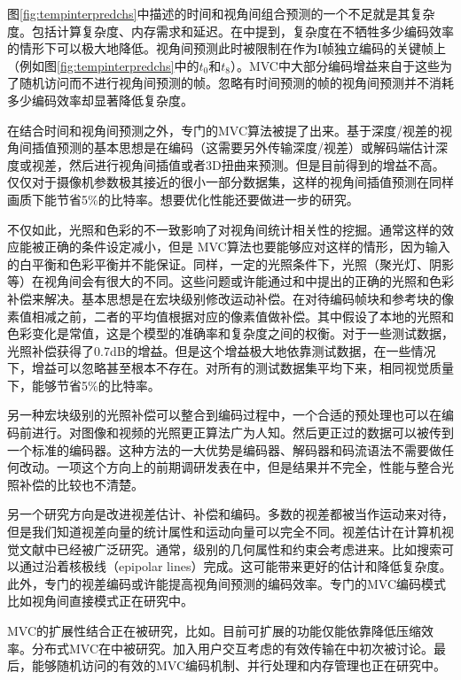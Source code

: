 图\ref{fig:tempinterpredchs}中描述的时间和视角间组合预测的一个不足就是其复杂度。包括计算复杂度、内存需求和延迟。在中提到，复杂度在不牺牲多少编码效率的情形下可以极大地降低。视角间预测此时被限制在作为I帧独立编码的关键帧上（例如图\ref{fig:tempinterpredchs}中的$t_0$和$t_8$）。MVC中大部分编码增益来自于这些为了随机访问而不进行视角间预测的帧。忽略有时间预测的帧的视角间预测并不消耗多少编码效率却显著降低复杂度。

在结合时间和视角间预测之外，专门的MVC算法被提了出来。基于深度/视差的视角间插值预测\cite{martinian2006view, kitahara2006multi, martinian2006extensions}的基本思想是在编码（这需要另外传输深度/视差）或解码端估计深度或视差，然后进行视角间插值或者3D扭曲来预测。但是目前得到的增益不高。仅仅对于摄像机参数极其接近的很小一部分数据集，这样的视角间插值预测在同样画质下能节省5\%的比特率。想要优化性能还要做进一步的研究。

不仅如此，光照和色彩的不一致影响了对视角间统计相关性的挖掘。通常这样的效应能被正确的条件设定减小，但是 MVC算法也要能够应对这样的情形，因为输入的白平衡和色彩平衡并不能保证。同样，一定的光照条件下，光照（聚光灯、阴影等）在视角间会有很大的不同。这些问题或许能通过和中提出的正确的光照和色彩补偿来解决。基本思想是在宏块级别修改运动补偿。在对待编码帧块和参考块的像素值相减之前，二者的平均值根据对应的像素值做补偿。其中假设了本地的光照和色彩变化是常值，这是个模型的准确率和复杂度之间的权衡。对于一些测试数据，光照补偿获得了0.7dB的增益。但是这个增益极大地依靠测试数据，在一些情况下，增益可以忽略甚至根本不存在。对所有的测试数据集平均下来，相同视觉质量下，能够节省5\%的比特率。

另一种宏块级别的光照补偿可以整合到编码过程中，一个合适的预处理也可以在编码前进行。对图像和视频的光照更正算法广为人知。然后更正过的数据可以被传到一个标准的编码器。这种方法的一大优势是编码器、解码器和码流语法不需要做任何改动。一项这个方向上的前期调研发表在中，但是结果并不完全，性能与整合光照补偿的比较也不清楚。

另一个研究方向是改进视差估计、补偿和编码\cite{lu2009effective}。多数的视差都被当作运动来对待，但是我们知道视差向量的统计属性和运动向量可以完全不同。视差估计在计算机视觉文献中已经被广泛研究。通常，级别的几何属性和约束会考虑进来。比如搜索可以通过沿着核极线（epipolar lines）完成。这可能带来更好的估计和降低复杂度。此外，专门的视差编码或许能提高视角间预测的编码效率。专门的MVC编码模式比如视角间直接模式\cite{guo2006inter}正在研究中。

MVC的扩展性结合正在被研究，比如。目前可扩展的功能仅能依靠降低压缩效率。分布式MVC在中被研究。加入用户交互考虑的有效传输在中初次被讨论。最后，能够随机访问的有效的MVC编码机制、并行处理和内存管理也正在研究中。

